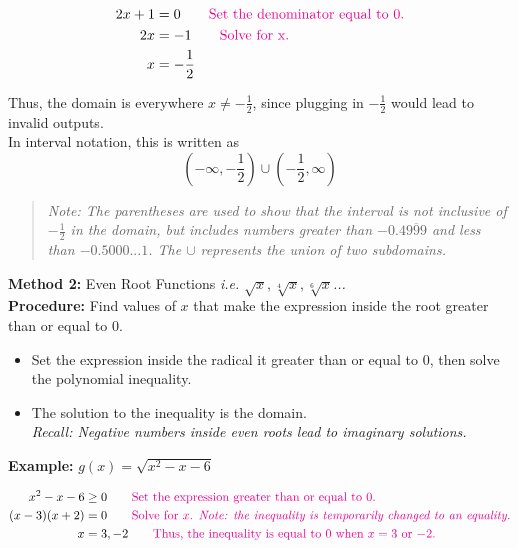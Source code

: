 \documentclass[10pt]{article}
\begin{document}
    \begin{align*}
    2x+1 &= 0 \qquad \text{\color{magenta}{Set the denominator equal to 0.}}\\ 
    2x &= -1 \qquad \text{\color{magenta}{Solve for x.}}\\ 
    x &= -\frac{1}{2}
    \end{align*}

    Thus, the domain is everywhere $x \neq -\frac{1}{2}$, since plugging in $-\frac{1}{2}$ would lead to invalid outputs. \\
    \indent In interval notation, this is written as $$(-\infty, -\frac{1}{2})\cup (-\frac{1}{2}, \infty)$$ 
    \begin{quote} 
    \textit{Note: The parentheses are used to show that the interval is not inclusive of $-\frac{1}{2}$ in the domain, but includes numbers greater than $-0.4\overline{999}$ and less than $-0.5000...1$. The $\cup$ represents the union of two subdomains.} \\
    \end{quote} 

\noindent \textbf{Method 2:} Even Root Functions \quad \textit{i.e. $\sqrt{x}, \sqrt[4]{x}, \sqrt[6]{x}$...}\\
{\color{magenta}
\textbf{Procedure:} Find values of $x$ that make the expression inside the root greater than or equal to 0.}
\begin{itemize}
    \item Set the expression inside the radical it greater than or equal to 0, then solve the polynomial inequality.
    \item The solution to the inequality is the domain. \\
    \textit{Recall: Negative numbers inside even roots lead to imaginary solutions.}
\end{itemize}
{\color{blue}
\textbf{Example:}} $g(x) = \sqrt{x^2-x-6}$

    \begin{align*}
    x^2-x-6 &\geq 0 \qquad \text{\color{magenta}{Set the expression greater than or equal to 0.}}\\ 
    (x-3)(x+2) &= 0 \qquad \text{\color{magenta}{Solve for $x$. \textit{Note: the inequality is temporarily changed to an equality.}}}\\ 
    x &= 3, -2 \qquad \text{\color{magenta}{Thus, the inequality is equal to 0 when $x = 3$ or $-2$.}}
    \end{align*}
\end{document}
